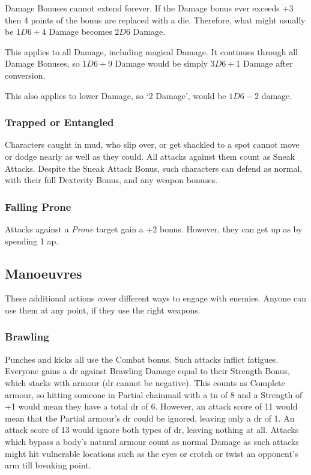 \begin{multicols}{2}
Damage Bonuses cannot extend forever. If the Damage bonus ever exceeds +3 then 4 points of the bonus are replaced with a die. Therefore, what might usually be $1D6+4$ Damage becomes $2D6$ Damage.

This applies to all Damage, including magical Damage. It continues through all Damage Bonuses, so $1D6+9$ Damage would be simply $3D6+1$ Damage after conversion.

This also applies to lower Damage, so `2 Damage', would be $1D6-2$ damage.

\subsubsection[Trapped/ Entangled: All attacks against the character count as a Sneak Attack, but they can still defend with full Dexterity Bonus as usual]{Trapped or Entangled}

Characters caught in mud, who slip over, or get shackled to a spot cannot move or dodge nearly as well as they could.
All attacks against them count as Sneak Attacks.
Despite the Sneak Attack Bonus, such characters can defend as normal, with their full Dexterity Bonus, and any weapon bonuses.

\subsubsection[Falling Prone: -2 penalty when on the ground]{Falling Prone}
\label{prone}

Attacks against a \textit{Prone} target gain a +2 bonus.
However, they can get up as by spending 1 \gls{ap}.

\subsection{Manoeuvres}

These additional actions cover different ways to engage with enemies.
Anyone can use them at any point, if they use the right weapons.

\subsubsection[Brawling: Make a normal attack roll, but any attack with a Margin less than 5 only inflicts \glspl{fatigue} rather than Damage]{Brawling}

Punches and kicks all use the Combat bonus.
Such attacks inflict \glspl{fatigue}.
Everyone gains a \gls{dr} against Brawling Damage equal to their Strength Bonus, which stacks with armour (\gls{dr} cannot be negative).
This counts as Complete armour, so hitting someone in Partial chainmail with a \gls{tn} of 8 and a Strength of +1 would mean they have a total \gls{dr} of 6.
However, an attack score of 11 would mean that the Partial armour's \gls{dr} could be ignored, leaving only a \gls{dr} of 1.
An attack score of 13 would ignore both types of \gls{dr}, leaving nothing at all.
Attacks which bypass a body's natural armour count as normal Damage as such attacks might hit vulnerable locations such as the eyes or crotch or twist an opponent's arm till breaking point.


\end{multicols}
